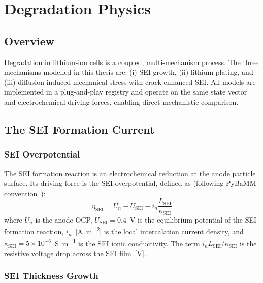 \chapter{Degradation Physics}
\label{ch:degradation}

\section{Overview}

Degradation in lithium-ion cells is a coupled, multi-mechanism process. The three mechanisms modelled in this thesis are: (i) SEI growth, (ii) lithium plating, and (iii) diffusion-induced mechanical stress with crack-enhanced SEI. All models are implemented in a plug-and-play registry and operate on the same state vector and electrochemical driving forces, enabling direct mechanistic comparison.

\section{The SEI Formation Current}
\label{sec:sei_physics}

\subsection{SEI Overpotential}

The SEI formation reaction is an electrochemical reduction at the anode particle surface. Its driving force is the SEI overpotential, defined as (following PyBaMM convention~\cite{Sulzer2021}):
\begin{equation}
  \eta_\text{SEI} = U_n - U_\text{SEI} - i_n \frac{L_\text{SEI}}{\kappa_\text{SEI}}
  \label{eq:eta_sei}
\end{equation}
where $U_n$ is the anode OCP, $U_\text{SEI} = 0.4$~V is the equilibrium potential of the SEI formation reaction, $i_n$~[\si{\ampere\per\meter\squared}] is the local intercalation current density, and $\kappa_\text{SEI} = 5\times10^{-6}$~\si{\siemens\per\meter} is the SEI ionic conductivity. The term $i_n L_\text{SEI}/\kappa_\text{SEI}$ is the resistive voltage drop across the SEI film~[\si{\volt}].

\subsection{SEI Thickness Growth}

